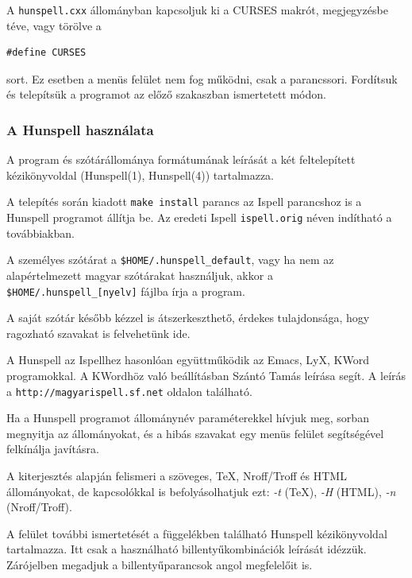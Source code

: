 A \texttt{hunspell.cxx} állományban kapcsoljuk ki a
\textsc{CURSES} makrót, megjegyzésbe téve, vagy törölve a

\begin{verbatim}
#define CURSES
\end{verbatim}

sort. Ez esetben a menüs felület nem fog működni, csak
a parancssori. Fordítsuk és telepítsük a programot az előző
szakaszban ismertetett módon.

\subsubsection{A Hunspell használata}

A program és szótárállománya formátumának leírását a két
feltelepített kézikönyvoldal (Hunspell(1), Hunspell(4))
tartalmazza.

A telepítés során kiadott \texttt{make install} parancs az
Ispell parancshoz is a Hunspell programot
állítja be. Az eredeti Ispell \texttt{ispell.orig} néven indítható
a továbbiakban.
 
A személyes szótárat a \texttt{\$HOME/.hunspell\_default}, vagy
ha nem az alapértelmezett magyar szótárakat használjuk, akkor a
\texttt{\$HOME/.hunspell\_[nyelv]} fájlba írja a program.

A saját szótár később kézzel is átszerkeszthető, érdekes
tulajdonsága, hogy ragozható szavakat is felvehetünk ide.

A Hunspell az Ispellhez hasonlóan együttműködik 
az Emacs, LyX, KWord programokkal. A KWordhöz való
beállításban Szántó Tamás leírása segít. A leírás a
\texttt{http://magyarispell.sf.net} oldalon található.

Ha a Hunspell programot állománynév paraméterekkel
hívjuk meg, sorban megnyitja az állományokat, és a hibás
szavakat egy menüs felület segítségével felkínálja
javításra.

A kiterjesztés alapján felismeri a szöveges,
\TeX{}, Nroff/Troff és HTML állományokat, de kapcsolókkal
is befolyásolhatjuk ezt: \emph{-t} (\TeX{}),
\emph{-H} (HTML), \emph{-n} (Nroff/Troff).

A felület további ismertetését a függelékben található
Hunspell kézikönyvoldal tartalmazza. Itt csak a
használható billentyűkombinációk leírását idézzük.
Zárójelben megadjuk a billentyűparancsok angol
megfelelőit is.


